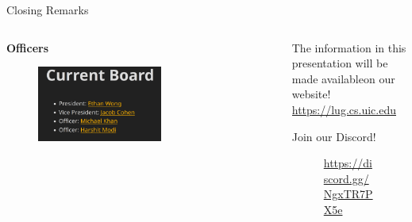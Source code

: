 \documentclass{beamer}
\begin{document}
\begin{frame}{Closing Remarks}
	\begin{columns}
		\begin{column}{0.5\textwidth}
			\textbf{Officers}
			\begin{figure}
				\centering
				\includegraphics[width=0.60\textwidth]{officers.png}
			\end{figure}
		\end{column}
		\begin{column}{0.5\textwidth}
			The information in this presentation will be made
			available\footnotemark on our website!\\
			\url{https://lug.cs.uic.edu}
			
			\bigskip
			Join our Discord!

			\begin{figure}
				\centering
				
				\caption{\url{https://discord.gg/NgxTR7PX5e}}
			\end{figure}
		\end{column}
	\end{columns}

\end{frame}
\end{document}
